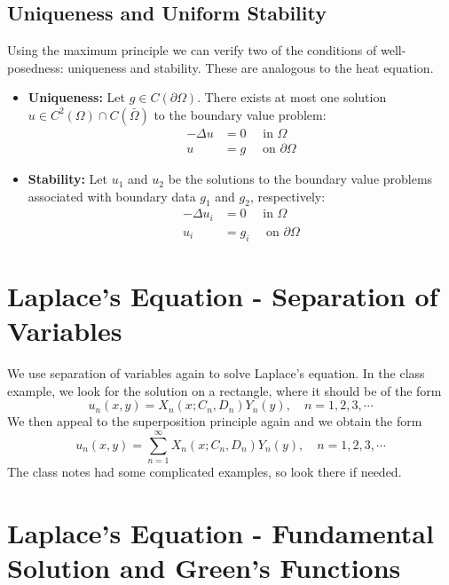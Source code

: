\documentclass[11pt]{article}
\begin{document}
\subsection{Uniqueness and Uniform Stability}
Using the maximum principle we can verify two of the conditions of well-posedness: uniqueness and stability.  These are analogous to the heat equation. 
\begin{itemize}
\item \textbf{Uniqueness:}  Let $g \in C(\partial \Omega)$. There exists at most one solution $u \in C^2(\Omega) \cap C(\bar{\Omega})$ to the boundary value problem:
\begin{align*}
- \Delta u &= 0 \quad \text{ in } \Omega \\
u &=g \quad \text{ on } \partial \Omega 
\end{align*}
\item  \textbf{Stability:} Let $u_1$ and $u_2$ be the solutions to the boundary value problems associated with boundary data $g_1$ and $g_2$, respectively:
\begin{align*}
- \Delta u_i &= 0 \quad \text{ in } \Omega \\
u_i &=g_i \quad \text{ on } \partial \Omega 
\end{align*}
\end{itemize}

\pagebreak

\section{Laplace's Equation - Separation of Variables }
We use separation of variables again to solve Laplace's equation. In the class example, we look for the solution on a rectangle, where it should be of the form
$$ u_n(x,y) = X_n (x; C_n, D_n)Y_n(y), \quad n=1,2,3, \cdots $$
We then appeal to the superposition principle again and we obtain the form 
$$ u_n(x,y) = \sum_{n=1}^{\infty}  X_n (x; C_n, D_n)Y_n(y), \quad n=1,2,3, \cdots $$
The class notes had some complicated examples, so look there if needed.

\pagebreak

\section{Laplace's Equation - Fundamental Solution and Green's Functions}
\end{document}
